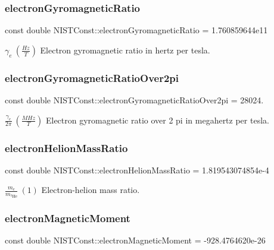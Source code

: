 \subsubsection{\texorpdfstring{electron\+Gyromagnetic\+Ratio}{electronGyromagneticRatio}}
{\footnotesize\ttfamily const double N\+I\+S\+T\+Const\+::electron\+Gyromagnetic\+Ratio = 1.\+760859644e11}

$\gamma_e \ (\frac{Hz}{T})$ Electron gyromagnetic ratio in hertz per tesla. \mbox{\label{group___electron_ga67e6ebbd2c2d8043cbdb09979dc7247b}} 
\subsubsection{\texorpdfstring{electron\+Gyromagnetic\+Ratio\+Over2pi}{electronGyromagneticRatioOver2pi}}
{\footnotesize\ttfamily const double N\+I\+S\+T\+Const\+::electron\+Gyromagnetic\+Ratio\+Over2pi = 28024.}

$\frac{\gamma_e}{2\pi} \ (\frac{MHz}{T})$ Electron gyromagnetic ratio over 2 pi in megahertz per tesla. \mbox{\label{group___electron_ga5039598cd8a51d15d9dfbb0463c109d6}} 
\subsubsection{\texorpdfstring{electron\+Helion\+Mass\+Ratio}{electronHelionMassRatio}}
{\footnotesize\ttfamily const double N\+I\+S\+T\+Const\+::electron\+Helion\+Mass\+Ratio = 1.\+819543074854e-\/4}

$\frac{m_e}{m_{^3\textrm{He}}} \ (1)$ Electron-\/helion mass ratio. \mbox{\label{group___electron_ga81fc83bd665b7b4fb83e9901ed7d6628}} 
\subsubsection{\texorpdfstring{electron\+Magnetic\+Moment}{electronMagneticMoment}}
{\footnotesize\ttfamily const double N\+I\+S\+T\+Const\+::electron\+Magnetic\+Moment = -\/928.\+4764620e-\/26}

